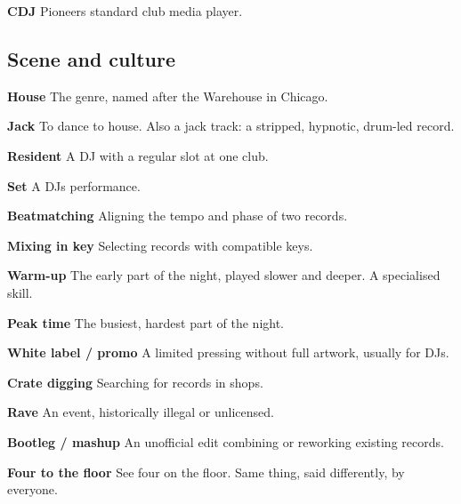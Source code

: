 \textbf{CDJ} Pioneer\textquotesingle s standard club media player.

\subsection{Scene and culture}\label{th09_glossary-scene-and-culture}

\textbf{House} The genre, named after the Warehouse in Chicago.

\textbf{Jack} To dance to house. Also a jack track: a stripped, hypnotic, drum-led record.

\textbf{Resident} A DJ with a regular slot at one club.

\textbf{Set} A DJ\textquotesingle s performance.

\textbf{Beatmatching} Aligning the tempo and phase of two records.

\textbf{Mixing in key} Selecting records with compatible keys.

\textbf{Warm-up} The early part of the night, played slower and deeper. A specialised skill.

\textbf{Peak time} The busiest, hardest part of the night.

\textbf{White label / promo} A limited pressing without full artwork, usually for DJs.

\textbf{Crate digging} Searching for records in shops.

\textbf{Rave} An event, historically illegal or unlicensed.

\textbf{Bootleg / mashup} An unofficial edit combining or reworking existing records.

\textbf{Four to the floor} See four on the floor. Same thing, said differently, by everyone.
